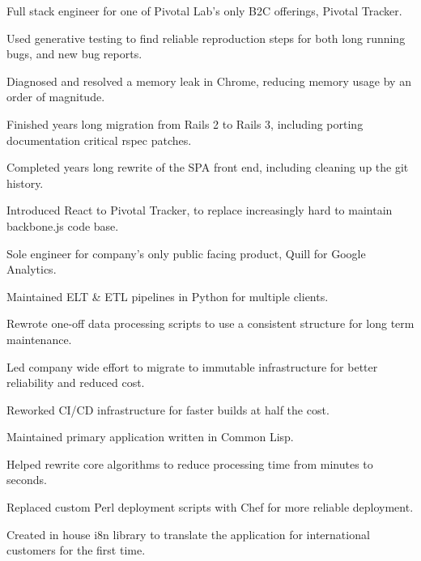 \documentclass[]{deedy-resume-openfont}
\begin{document}
\vspace{\topsep}
Full stack engineer for one of Pivotal Lab's only B2C offerings, Pivotal Tracker.
\vspace{\topsep}
\begin{tightemize}
\item Used generative testing to find reliable reproduction steps for both long running bugs, and new bug reports.
\item Diagnosed and resolved a memory leak in Chrome, reducing memory usage by an order of magnitude.
\item Finished years long migration from Rails 2 to Rails 3, including porting documentation critical rspec patches.
\item Completed years long rewrite of the SPA front end, including cleaning up the git history.
\item Introduced React to Pivotal Tracker, to replace increasingly hard to maintain backbone.js code base.
\end{tightemize}

\sectionsep
{}
\vspace{\topsep}
\begin{tightemize}
\item Sole engineer for company's only public facing product, Quill for Google Analytics.
\item Maintained ELT \& ETL pipelines in Python for multiple clients.
\item Rewrote one-off data processing scripts to use a consistent structure for long term maintenance.
\item Led company wide effort to migrate to immutable infrastructure for better reliability and reduced cost.
\item Reworked CI/CD infrastructure for faster builds at half the cost.
\end{tightemize}

\sectionsep
{}
\vspace{\topsep}
\begin{tightemize}
\item Maintained primary application written in Common Lisp.
\item Helped rewrite core algorithms to reduce processing time from minutes to seconds.
\item Replaced custom Perl deployment scripts with Chef for more reliable deployment.
\item Created in house i8n library to translate the application for international customers for the first time.
\end{tightemize}
\end{document}
